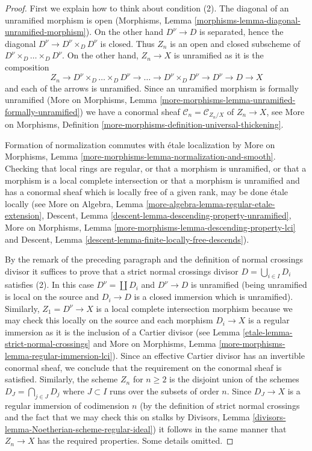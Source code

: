 \begin{proof}

First we explain how to think about condition (2).
The diagonal of an unramified morphism is open
(Morphisms, Lemma \ref{morphisms-lemma-diagonal-unramified-morphism}).
On the other hand $D^\nu \to D$ is separated, hence the
diagonal $D^\nu \to D^\nu \times_D D^\nu$ is closed.
Thus $Z_n$ is an open and closed subscheme of
$D^\nu \times_D \ldots \times_D D^\nu$. On the other hand,
$Z_n \to X$ is unramified as it is the composition
$$
Z_n \to D^\nu \times_D \ldots \times_D D^\nu \to \ldots \to
D^\nu \times_D D^\nu \to D^\nu \to D \to X
$$
and each of the arrows is unramified.
Since an unramified morphism is formally unramified
(More on Morphisms, Lemma
\ref{more-morphisms-lemma-unramified-formally-unramified})
we have a conormal sheaf
$\mathcal{C}_n = \mathcal{C}_{Z_n/X}$ of $Z_n \to X$, see
More on Morphisms, Definition
\ref{more-morphisms-definition-universal-thickening}.

\medskip\noindent
Formation of normalization commutes with \'etale localization by
More on Morphisms, Lemma \ref{more-morphisms-lemma-normalization-and-smooth}.
Checking that local rings are regular, or that
a morphism is unramified, or that a morphism is a
local complete intersection or that a morphism is
unramified and has a conormal sheaf which is
locally free of a given rank, may be done \'etale locally (see
More on Algebra, Lemma \ref{more-algebra-lemma-regular-etale-extension},
Descent, Lemma \ref{descent-lemma-descending-property-unramified},
More on Morphisms, Lemma \ref{more-morphisms-lemma-descending-property-lci}
and
Descent, Lemma \ref{descent-lemma-finite-locally-free-descends}).

\medskip\noindent
By the remark of the preceding paragraph and the definition
of normal crossings divisor it suffices to prove that a
strict normal crossings divisor $D = \bigcup_{i \in I} D_i$
satisfies (2). In this case $D^\nu = \coprod D_i$
and $D^\nu \to D$ is unramified (being unramified
is local on the source and $D_i \to D$ is a closed
immersion which is unramified). Similarly, $Z_1 = D^\nu \to X$
is a local complete intersection morphism because we may
check this locally on the source and each morphism $D_i \to X$
is a regular immersion as it is the inclusion of a Cartier divisor
(see Lemma \ref{etale-lemma-strict-normal-crossings} and
More on Morphisms, Lemma \ref{more-morphisms-lemma-regular-immersion-lci}).
Since an effective Cartier divisor has an invertible
conormal sheaf, we conclude that the requirement on the
conormal sheaf is satisfied.
Similarly, the scheme $Z_n$ for $n \geq 2$ is the disjoint union
of the schemes $D_J = \bigcap_{j \in J} D_j$ where $J \subset I$
runs over the subsets of order $n$. Since $D_J \to X$ is
a regular immersion of codimension $n$
(by the definition of strict normal crossings and the
fact that we may check this on stalks by
Divisors, Lemma \ref{divisors-lemma-Noetherian-scheme-regular-ideal})
it follows in the same manner that $Z_n \to X$ has the required
properties. Some details omitted.


\end{proof}
